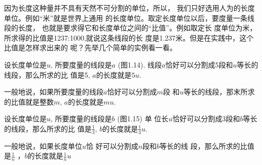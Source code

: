 因为长度这种量并不具有天然不可分割的单位，所以，
我们只好选用人为的长度单位。例如“米”就是世界上通用
的长度单位。取定长度单位以后，要度量一条线段的长度，
也就是要求得它和长度单位之间的“比值”。例如取定长
度单位为米，所求得的比值是1237:1000,就说这条线段的长
度是1.237米。但是在实践中，这个比值是怎样求出来的
呢？先举几个简单的实例看一看。

\begin{example}
设长度单位是$u$, 所要度量的线段是$a$ (图1.14).
线段$a$恰好可以分割成5段和$u$等长的线段，那么所求的比
值是5, $a$的长度就是$5u$. 

一般地说，如果所要度量的线段$a$恰好可以分割成$m$段
和$u$等长的线段，那末所求的比值就是整数$m$, $a$的长度就是$mu$.
\end{example}

\begin{figure}[htp]\centering
    \begin{minipage}[t]{0.48\textwidth}
    \centering
{}
    \caption{}
    \end{minipage}
    \begin{minipage}[t]{0.48\textwidth}
    \centering
    \caption{}
    \end{minipage}
    \end{figure}

\begin{example}
设长度单位是$u$, 所要度量的线段是$b$ (图1.15) 单
位长$u$恰好可以分割成3段和$b$等长的线段，那么所求的比
值是$\frac{1}{3}$, $b$的长度就是$\frac{1}{3}u$. 

一般地说，如果长度单位$u$恰
好可以分割成$n$段和$b$等长的线
段，那么所求的比值是$\frac{1}{n}$
，$b$的长度就是$\frac{1}{n}u$
\end{example}

